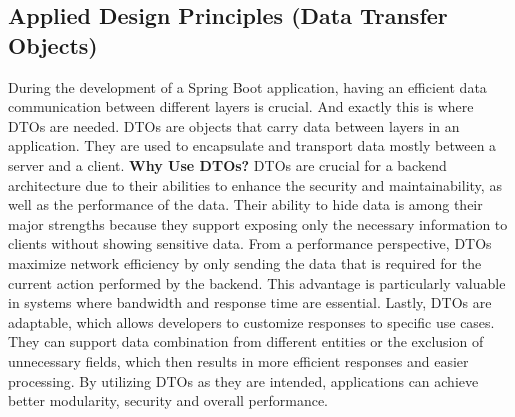     \subsection{Applied Design Principles (Data Transfer Objects)}
    During the development of a Spring Boot application, having an efficient data communication between different layers is crucial. And exactly this is where DTOs are needed. \newline
    DTOs are objects that carry data between layers in an application. They are used to encapsulate and transport data mostly between a server and a client.
    \newline \newline
    \textbf{Why Use DTOs?} \newline
    DTOs are crucial for a backend architecture due to their abilities to enhance the security and maintainability, as well as the performance of the data. Their ability to hide data is among their major strengths because they support exposing only the necessary information to clients without showing sensitive data. \newline
    From a performance perspective, DTOs maximize network efficiency by only sending the data that is required for the current action performed by the backend. This advantage is particularly valuable in systems where bandwidth and response time are essential. \newline
    Lastly, DTOs are adaptable, which allows developers to customize responses to specific use cases. They can support data combination from different entities or the exclusion of unnecessary fields, which then results in more efficient responses and easier processing. \newline
    By utilizing DTOs as they are intended, applications can achieve better modularity, security and overall performance. 

    \blankLine

